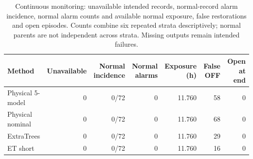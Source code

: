 \begin{table}[t]\centering\small
\caption{Continuous monitoring: unavailable intended records, normal-record alarm incidence, normal alarm counts and available normal exposure, false restorations and open episodes. Counts combine six repeated strata descriptively; normal parents are not independent across strata. Missing outputs remain intended failures.}
\label{tab:c01_operational}
\begin{tabular}{lrrrrrr}\toprule
Method & Unavailable & Normal incidence & Normal alarms & Exposure (h) & False OFF & Open at end\\\midrule
Physical 5-model & 0 & 0/72 & 0 & 11.760 & 58 & 0\\
Physical nominal & 0 & 0/72 & 0 & 11.760 & 68 & 0\\
ExtraTrees & 0 & 0/72 & 0 & 11.760 & 29 & 0\\
ET short & 0 & 0/72 & 0 & 11.760 & 16 & 0\\
\bottomrule\end{tabular}\end{table}
